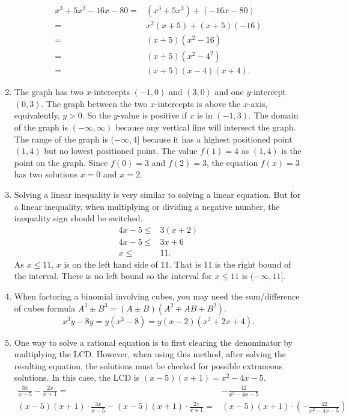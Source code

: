 \documentclass[
  12pt]{article}
\begin{document}
\begin{enumerate}
  \[
   \begin{aligned}
   x^3+5x^2-16x-80=&(x^3+5x^2)+(-16x-80)\\
   =&x^2(x+5)+(x+5)(-16)\\
   =&(x+5)(x^2-16)\\
   =&(x+5)(x^2-4^2)\\
   =&(x+5)(x-4)(x+4).
   \end{aligned}
   \]
\item
  The graph has two \(x\)-intercepts \((-1, 0)\) and \((3,0)\) and one
  \(y\)-intercept \((0, 3)\). The graph between the two \(x\)-intercepts
  is above the \(x\)-axis, equivalently, \(y>0\). So the \(y\)-value is
  positive if \(x\) is in \((-1,3)\). The domain of the graph is
  \((-\infty, \infty)\) because any vertical line will intersect the
  graph. The range of the graph is \((-\infty, 4]\) because it has a
  highest positioned point \((1, 4)\) but no lowest positioned point.
  The value \(f(1)=4\) as \((1, 4)\) is the point on the graph. Since
  \(f(0)=3\) and \(f(2)=3\), the equation \(f(x)=3\) has two solutions
  \(x=0\) and \(x=2\).
\item
  Solving a linear inequality is very similar to solving a linear
  equation. But for a linear inequality, when multiplying or dividing a
  negative number, the inequality sign should be switched. \[
   \begin{aligned}
   4x-5\leq& 3(x+2)\\
   4x-5\leq& 3x+6\\
   x\leq&11.
   \end{aligned}
   \] As \(x\leq 11\), \(x\) is on the left hand side of 11. That is 11
  is the right bound of the interval. There is no left bound so the
  interval for \(x\le 11\) is \((-\infty, 11]\).
\item
  When factoring a binomial involving cubes, you may need the
  sum/difference of cubes formula
  \(A^3\pm B^3=(A\pm B)(A^2\mp AB+B^2)\).
  \[x^3y-8y=y(x^3-8)=y(x-2)(x^2+2x+4).\]
\item
  One way to solve a rational equation is to first clearing the
  denominator by multiplying the LCD. However, when using this method,
  after solving the resulting equation, the solutions must be checked
  for possible extraneous solutions. In this case, the LCD is
  \((x-5)(x+1)=x^2-4x-5\). \[
   \begin{aligned}
   \frac{3x}{x-5}-\frac{2x}{x+1}=&-\frac{42}{x^2-4x-5}\\
   (x-5)(x+1)\cdot\frac{3x}{x-5}-(x-5)(x+1)\cdot\frac{2x}{x+1}=&(x-5)(x+1)\cdot\left(-\frac{42}{x^2-4x-5}\right)\\

\end{aligned}\]
\end{enumerate}
\end{document}
